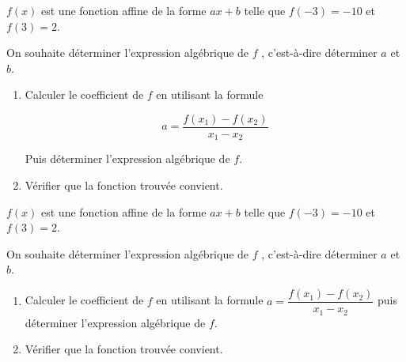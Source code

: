 \begin{exercice*}
    $f(x)$ est une fonction affine de la forme $ax+b$ telle que $f(-3)=-10$ et $f(3)=2$.

    On souhaite déterminer l'expression algébrique de $f$ , c'est-à-dire déterminer $a$ et $b$.
    \begin{enumerate}
        \item Calculer le coefficient de $f$ en utilisant la formule 
        
        $$a=\dfrac{f(x_1)-f(x_2)}{x_1-x_2}$$
        
        Puis déterminer l'expression algébrique de $f$.
        \item Vérifier que la fonction trouvée convient.
    \end{enumerate}
\end{exercice*}
\begin{corrige}
    $f(x)$ est une fonction affine de la forme $ax+b$ telle que $f(-3)=-10$ et $f(3)=2$.

    On souhaite déterminer l'expression algébrique de $f$ , c'est-à-dire déterminer $a$ et $b$.
    \begin{enumerate}
        \item Calculer le coefficient de $f$ en utilisant la formule $a=\dfrac{f(x_1)-f(x_2)}{x_1-x_2}$ puis déterminer l'expression algébrique de $f$.
        
        {\color{red} }
        \item Vérifier que la fonction trouvée convient.
        
        {\color{red}%

        }
    \end{enumerate}
\end{corrige}
